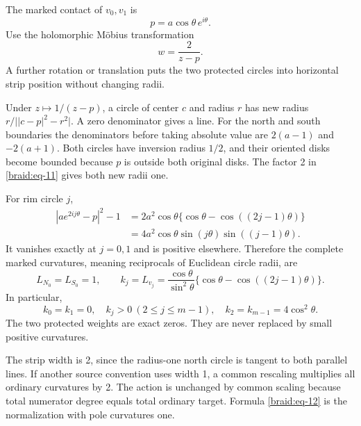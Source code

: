 \documentclass[11pt]{article}
\numberwithin{equation}{section}
\begin{document}
The marked contact of \(v_0,v_1\) is \[
                  p=a\cos\theta\,e^{i\theta}.
\] Use the holomorphic Möbius transformation \begin{equation}\label{braid:eq-11}
w=\frac{2}{z-p}.
\end{equation} A further rotation or translation puts the two protected circles into
horizontal strip position without changing radii.

Under \(z\mapsto1/(z-p)\), a circle of center \(c\) and radius \(r\) has
new radius \(r/\bigl||c-p|^2-r^2\bigr|\). A zero denominator gives a
line. For the north and south boundaries the denominators before taking
absolute value are \(2(a-1)\) and \(-2(a+1)\). Both circles have
inversion radius \(1/2\), and their oriented disks become bounded
because \(p\) is outside both original disks. The factor 2 in \eqref{braid:eq-11} gives
both new radii one.

For rim circle \(j\), \[
\begin{split}
 |ae^{2ij\theta}-p|^2-1
 &=2a^2\cos\theta
       \{\cos\theta-\cos((2j-1)\theta)\}\\
 &=4a^2\cos\theta\sin(j\theta)\sin((j-1)\theta).
\end{split}
\] It vanishes exactly at \(j=0,1\) and is positive elsewhere. Therefore
the complete marked curvatures, meaning reciprocals of Euclidean circle
radii, are \begin{equation}\label{braid:eq-12}
L_{N_0}=L_{S_0}=1,\qquad
 k_j=L_{v_j}
 =\frac{\cos\theta}{\sin^2\theta}
       \{\cos\theta-\cos((2j-1)\theta)\}.
\end{equation} In particular, \begin{equation}\label{braid:eq-13}
k_0=k_1=0,\quad
 k_j>0\ (2\le j\le m-1),\quad
 k_2=k_{m-1}=4\cos^2\theta.
\end{equation} The two protected weights are exact zeros. They are never replaced by
small positive curvatures.

The strip width is 2, since the radius-one north circle is tangent to
both parallel lines. If another source convention uses width 1, a common
rescaling multiplies all ordinary curvatures by 2. The action is
unchanged by common scaling because total numerator degree equals total
ordinary target. Formula \eqref{braid:eq-12} is the normalization with pole curvatures
one.
\end{document}
